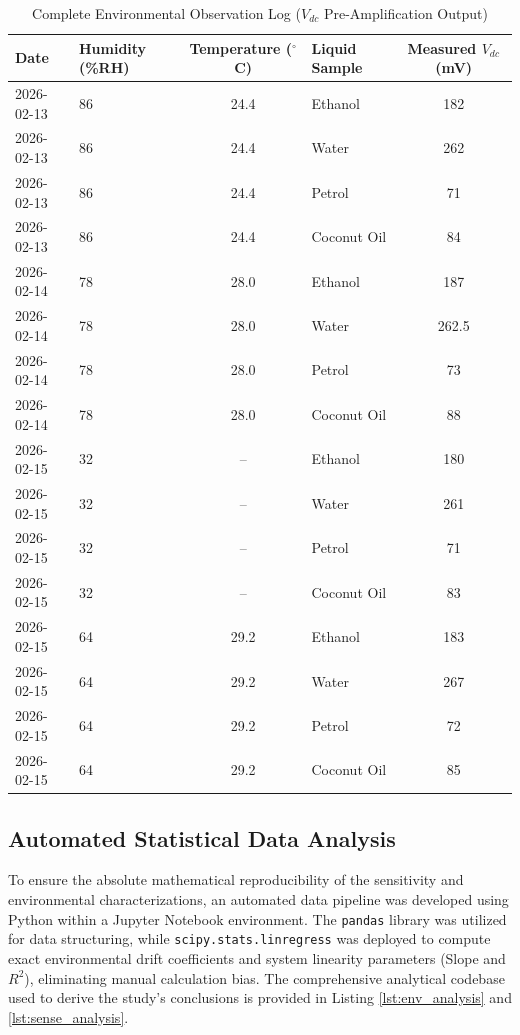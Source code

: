 \documentclass[11pt, a4paper]{article}
\begin{document}
\begin{table}[H]
\centering
\caption{Complete Environmental Observation Log ($V_{dc}$ Pre-Amplification Output)}
\label{tab:completelog}
\begin{tabular}{|l|l|c|l|c|}
\hline
\textbf{Date} & \textbf{Humidity (\%RH)} & \textbf{Temperature ($^\circ$C)} & \textbf{Liquid Sample} & \textbf{Measured $V_{dc}$ (mV)} \\ \hline
2026-02-13 & 86 & 24.4 & Ethanol & 182 \\ \hline
2026-02-13 & 86 & 24.4 & Water & 262 \\ \hline
2026-02-13 & 86 & 24.4 & Petrol & 71 \\ \hline
2026-02-13 & 86 & 24.4 & Coconut Oil & 84 \\ \hline
2026-02-14 & 78 & 28.0 & Ethanol & 187 \\ \hline
2026-02-14 & 78 & 28.0 & Water & 262.5 \\ \hline
2026-02-14 & 78 & 28.0 & Petrol & 73 \\ \hline
2026-02-14 & 78 & 28.0 & Coconut Oil & 88 \\ \hline
2026-02-15 & 32 & -- & Ethanol & 180 \\ \hline
2026-02-15 & 32 & -- & Water & 261 \\ \hline
2026-02-15 & 32 & -- & Petrol & 71 \\ \hline
2026-02-15 & 32 & -- & Coconut Oil & 83 \\ \hline
2026-02-15 & 64 & 29.2 & Ethanol & 183 \\ \hline
2026-02-15 & 64 & 29.2 & Water & 267 \\ \hline
2026-02-15 & 64 & 29.2 & Petrol & 72 \\ \hline
2026-02-15 & 64 & 29.2 & Coconut Oil & 85 \\ \hline
\end{tabular}
\end{table}

\subsection{Automated Statistical Data Analysis}
To ensure the absolute mathematical reproducibility of the sensitivity and environmental characterizations, an automated data pipeline was developed using Python within a Jupyter Notebook environment. The \texttt{pandas} library was utilized for data structuring, while \texttt{scipy.stats.linregress} was deployed to compute exact environmental drift coefficients and system linearity parameters (Slope and $R^2$), eliminating manual calculation bias. The comprehensive analytical codebase used to derive the study's conclusions is provided in Listing \ref{lst:env_analysis} and \ref{lst:sense_analysis}.
\end{document}
